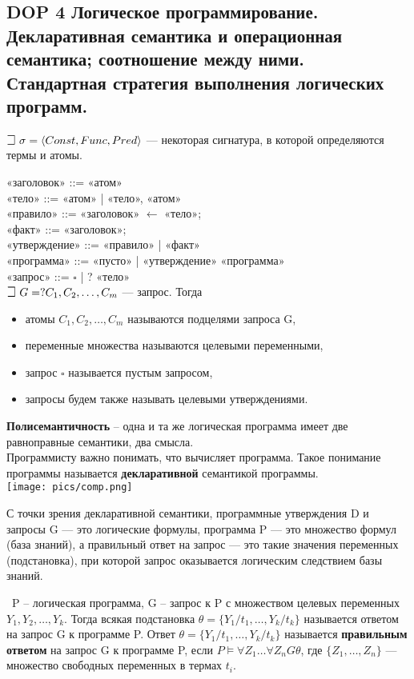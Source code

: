 \subsection*{DOP 4 Логическое  программирование. Декларативная семантика и операционная семантика;  соотношение между ними.  Стандартная стратегия выполнения логических программ.}

$\mathLet ~ \sigma = \langle Const,Func,Pred\rangle$ — некоторая сигнатура, в которой определяются термы и атомы.

«заголовок» ::= «атом» \\
«тело» ::= «атом» | «тело», «атом» \\ 
«правило» ::= «заголовок» $\leftarrow$ «тело»; \\
«факт» ::= «заголовок»; \\ 
«утверждение» ::= «правило» | «факт» \\ 
«программа» ::= «пусто» | «утверждение» «программа» \\
«запрос» ::= $\square$ | ? «тело» \\

$\mathLet ~ G = ? C_{1},C_{2},\ldots,C_{m}$ — запрос. Тогда
\begin{itemize}
    \item атомы $C_{1},C_{2},\ldots,C_{m}$ называются подцелями запроса G,
    \item переменные множества называются целевыми переменными,
    \item запрос $\square$ называется пустым запросом,
    \item запросы будем также называть целевыми утверждениями.
\end{itemize}
 
\textbf{Полисемантичность} -- одна и та же логическая программа имеет две равноправные семантики, два смысла. \\
Программисту важно понимать, что вычисляет программа. Такое понимание программы называется \textbf{декларативной} семантикой программы. \\ 
\texttt{[image: pics/comp.png]}

С точки зрения декларативной семантики, программные утверждения D и запросы G — это логические формулы, программа P — это множество формул (база знаний), а правильный ответ на запрос — это такие значения переменных (подстановка), при которой запрос оказывается логическим следствием базы знаний.

\mathLet \ P -- логическая программа, G -- запрос к P с множеством целевых переменных $Y_{1},Y_{2},\ldots,Y_{k}$. Тогда всякая подстановка $\theta = \{Y_{1}/t_{1},\ldots,Y_{k}/t_{k}\}$ называется ответом на запрос G к программе P. Ответ $\theta = \{Y_{1}/t_{1},\ldots, Y_{k}/t_{k}\}$ называется \textbf{правильным ответом} на запрос G к программе P, если $P \models \forall Z_{1} \ldots \forall Z_{n}G\theta$, где $\{Z_{1},\ldots,Z_{n}\}$ --- множество свободных переменных в термах $t_i$.

